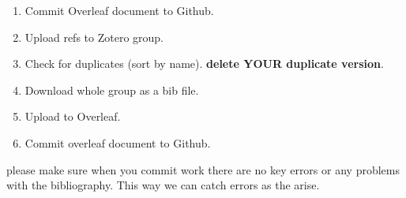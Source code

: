 \documentclass[9pt,bestpractices]{livecoms}
\begin{document}
\begin{enumerate}
    \item Commit Overleaf document to Github. 
    \item Upload refs to Zotero group. 
    \item Check for duplicates (sort by name).  \textbf{delete YOUR duplicate version}. 
    \item Download whole group as a bib file. 
    \item Upload to Overleaf. 
    \item Commit overleaf document to Github. 
\end{enumerate}

please make sure when you commit work there are no key errors or any problems with the bibliography.  This way we can catch errors as the arise. 




\end{document}
